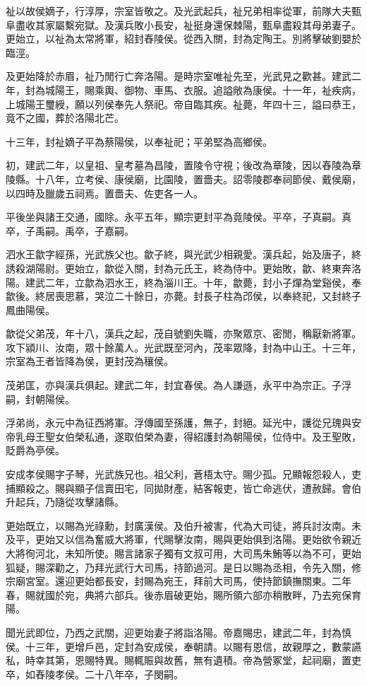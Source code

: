 \begin{pinyinscope}
祉以故侯嫡子，行淳厚，宗室皆敬之。及光武起兵，祉兄弟相率從軍，前隊大夫甄阜盡收其家屬繫宛獄。及漢兵敗小長安，祉挺身還保棘陽，甄阜盡殺其母弟妻子。更始立，以祉為太常將軍，紹封舂陵侯。從西入關，封為定陶王。別將擊破劉嬰於臨涇。

及更始降於赤眉，祉乃閒行亡奔洛陽。是時宗室唯祉先至，光武見之歡甚。建武二年，封為城陽王，賜乘輿、御物、車馬、衣服。追謚敞為康侯。十一年，祉疾病，上城陽王璽綬，願以列侯奉先人祭祀。帝自臨其疾。祉薨，年四十三，謚曰恭王，竟不之國，葬於洛陽北芒。

十三年，封祉嫡子平為蔡陽侯，以奉祉祀；平弟堅為高鄉侯。

初，建武二年，以皇祖、皇考墓為昌陵，置陵令守視；後改為章陵，因以舂陵為章陵縣。十八年，立考侯、康侯廟，比園陵，置嗇夫。詔零陵郡奉祠節侯、戴侯廟，以四時及臘歲五祠焉。置嗇夫、佐吏各一人。

平後坐與諸王交通，國除。永平五年，顯宗更封平為竟陵侯。平卒，子真嗣。真卒，子禹嗣。禹卒，子嘉嗣。

泗水王歙字經孫，光武族父也。歙子終，與光武少相親愛。漢兵起，始及唐子，終誘殺湖陽尉。更始立，歙從入關，封為元氏王，終為侍中。更始敗，歙、終東奔洛陽。建武二年，立歙為泗水王，終為淄川王。十年，歙薨，封小子燀為堂谿侯，奉歙後。終居喪思慕，哭泣二十餘日，亦薨。封長子柱為邔侯，以奉終祀，又封終子鳳曲陽侯。

歙從父弟茂，年十八，漢兵之起，茂自號劉失職，亦聚眾京、密閒，稱厭新將軍。攻下潁川、汝南，眾十餘萬人。光武既至河內，茂率眾降，封為中山王。十三年，宗室為王者皆降為侯，更封茂為穰侯。

茂弟匡，亦與漢兵俱起。建武二年，封宜春侯。為人謙遜，永平中為宗正。子浮嗣，封朝陽侯。

浮弟尚，永元中為征西將軍。浮傳國至孫護，無子，封絕。延光中，護從兄瑰與安帝乳母王聖女伯榮私通，遂取伯榮為妻，得紹護封為朝陽侯，位侍中。及王聖敗，貶爵為亭侯。

安成孝侯賜字子琴，光武族兄也。祖父利，蒼梧太守。賜少孤。兄顯報怨殺人，吏捕顯殺之。賜與顯子信賣田宅，同拋財產，結客報吏，皆亡命逃伏，遭赦歸。會伯升起兵，乃隨從攻擊諸縣。

更始既立，以賜為光祿勳，封廣漢侯。及伯升被害，代為大司徒，將兵討汝南。未及平，更始又以信為奮威大將軍，代賜擊汝南，賜與更始俱到洛陽。更始欲令親近大將徇河北，未知所使。賜言諸家子獨有文叔可用，大司馬朱鮪等以為不可，更始狐疑，賜深勸之，乃拜光武行大司馬，持節過河。是日以賜為丞相，令先入關，修宗廟宮室。還迎更始都長安，封賜為宛王，拜前大司馬，使持節鎮撫關東。二年春，賜就國於宛，典將六部兵。後赤眉破更始，賜所領六部亦稍散畔，乃去宛保育陽。

聞光武即位，乃西之武關，迎更始妻子將詣洛陽。帝嘉賜忠，建武二年，封為慎侯。十三年，更增戶邑，定封為安成侯，奉朝請。以賜有恩信，故親厚之，數蒙讌私，時幸其第，恩賜特異。賜輒賑與故舊，無有遺積。帝為營冢堂，起祠廟，置吏卒，如舂陵孝侯。二十八年卒，子閔嗣。


\end{pinyinscope}
